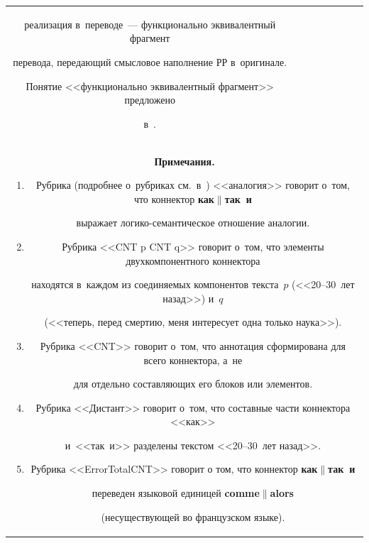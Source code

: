 \begin{table}
\begin{center}
\begin{tabular}{|c|p{23mm}|p{18mm}|p{24mm}|p{22mm}|c|c|}
{реализация  в~переводе~---  функционально эквивалентный фрагмент 


перевода, пе\-ре\-да\-ющий смыс\-ло\-вое наполнение РР в~оригинале. 


Понятие <<функционально эквивалентный фрагмент>> предложено 


в~\cite{15-ez}.}\\


\multicolumn{7}{p{130mm}}{\footnotesize \textbf{Примечания.}


   \begin{enumerate}[1.]


\item Рубрика (подробнее о~рубриках см.\ в~\cite{10-ez}) <<аналогия>> говорит о~том, что коннектор \textbf{как}$\|$\textbf{так~и}  


выражает ло\-ги\-ко-се\-ман\-ти\-че\-ское отношение аналогии.


\vspace*{-3pt}


\item Рубрика <<CNT p CNT q>> говорит о~том, что элементы двухкомпонентного коннектора 


находятся в~каждом из соединяемых компонентов текста~$p$ (<<20--30~лет назад>>) и~$q$ 


(<<теперь, перед смертию, меня интересует одна только наука>>).


\vspace*{-3pt}


\item Рубрика <<CNT>> говорит о~том, что аннотация сформирована для всего коннектора, а~не 


для отдельно составляющих его блоков или элементов. 


\vspace*{-3pt}


\item Рубрика <<Дистант>> говорит о~том, что составные час\-ти коннектора <<как>> 


и~<<так~и>> разделены текс\-том <<20--30~лет назад>>.


\vspace*{-3pt} 


\item Рубрика <<ErrorTotalCNT>> говорит о том, что коннектор \textbf{как}$\|$\textbf{так~и} 


переведен языковой единицей \textbf{comme}$\|$\textbf{alors} 


(несуществующей во французском языке).



\end{enumerate}}
\end{tabular}
\end{center}
\end{table}
